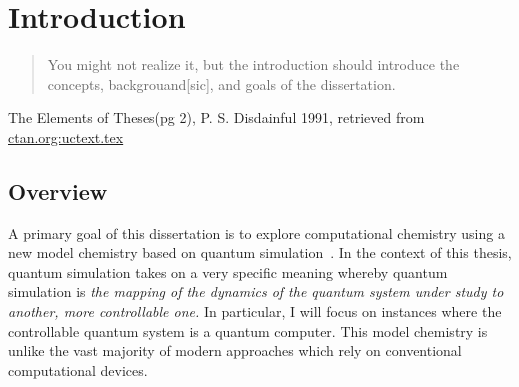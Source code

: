 \documentclass[11pt,oneside,final]{huthesis}%
\begin{document}


\ssp


\chapter{Introduction}\label{chp:intro}
\begin{quote}
	You might not realize it, but the introduction should introduce the concepts, backgrouand[sic], and goals of the dissertation.
\end{quote}
The Elements of Theses(pg 2), P. S. Disdainful 1991, retrieved from \href{ http://ctan.org/macros/latex/contrib/ucthesis/uctest.tex} {ctan.org:uctext.tex}   
\section{Overview}

A primary goal of this dissertation is to explore computational chemistry using a new model chemistry based on quantum simulation~\cite{Aspuru05}.  In the context of this thesis, quantum simulation takes on a very specific meaning whereby quantum simulation is \emph{the mapping of the dynamics of the quantum system under study to another, more controllable one.}  In particular, I will focus on instances where the controllable quantum system is a quantum computer.  This model chemistry is unlike the vast majority of modern approaches  which rely on conventional computational devices.
\end{document}
